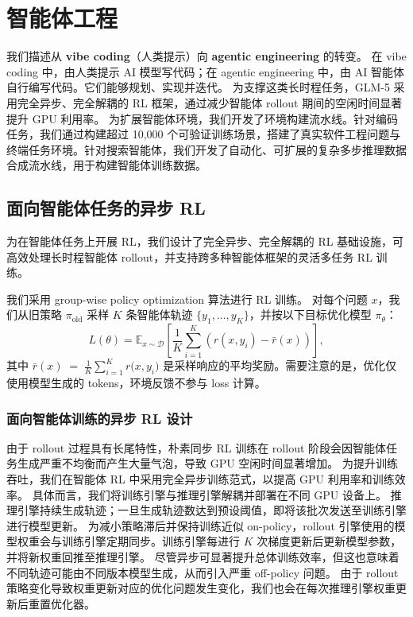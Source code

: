 \section{智能体工程}
我们描述从 \textbf{vibe coding}（人类提示）向 \textbf{agentic engineering} 的转变。
在 vibe coding 中，由人类提示 AI 模型写代码；在 agentic engineering 中，由 AI 智能体自行编写代码。它们能够规划、实现并迭代。
为支撑这类长时程任务，GLM-5 采用完全异步、完全解耦的 RL 框架，通过减少智能体 rollout 期间的空闲时间显著提升 GPU 利用率。
为扩展智能体环境，我们开发了环境构建流水线。针对编码任务，我们通过构建超过 10,000 个可验证训练场景，搭建了真实软件工程问题与终端任务环境。针对搜索智能体，我们开发了自动化、可扩展的复杂多步推理数据合成流水线，用于构建智能体训练数据。


\subsection{面向智能体任务的异步 RL}
为在智能体任务上开展 RL，我们设计了完全异步、完全解耦的 RL 基础设施，可高效处理长时程智能体 rollout，并支持跨多种智能体框架的灵活多任务 RL 训练。


我们采用 group-wise policy optimization 算法进行 RL 训练。
对每个问题 \(x\)，我们从旧策略
\(\pi_{\text{old}}\) 采样 \(K\) 条智能体轨迹 \(\{y_1,\dots,y_K\}\)，并按以下目标优化模型 \(\pi_\theta\)：
\[
L(\theta)
   = \mathbb{E}_{x\sim\mathcal{D}}\!\left[
        \frac{1}{K}\sum_{i=1}^{K}
        \left(
            r(x,y_i) - \bar{r}(x)
        \right)
     \right],
\]
其中 $\bar{r}(x) \;=\; \frac{1}{K}\sum_{i=1}^{K} r\bigl(x,y_i\bigr)$
是采样响应的平均奖励。需要注意的是，优化仅使用模型生成的 tokens，环境反馈不参与 loss 计算。

\subsubsection{面向智能体训练的异步 RL 设计}


由于 rollout 过程具有长尾特性，朴素同步 RL 训练在 rollout 阶段会因智能体任务生成严重不均衡而产生大量气泡，导致 GPU 空闲时间显著增加。
为提升训练吞吐，我们在智能体 RL 中采用完全异步训练范式，以提高 GPU 利用率和训练效率。
具体而言，我们将训练引擎与推理引擎解耦并部署在不同 GPU 设备上。
推理引擎持续生成轨迹；一旦生成轨迹数达到预设阈值，即将该批次发送至训练引擎进行模型更新。
为减小策略滞后并保持训练近似 on-policy，rollout 引擎使用的模型权重会与训练引擎定期同步。训练引擎每进行 $K$ 次梯度更新后更新模型参数，并将新权重回推至推理引擎。
尽管异步可显著提升总体训练效率，但这也意味着不同轨迹可能由不同版本模型生成，从而引入严重 off-policy 问题。
由于 rollout 策略变化导致权重更新对应的优化问题发生变化，我们也会在每次推理引擎权重更新后重置优化器。

